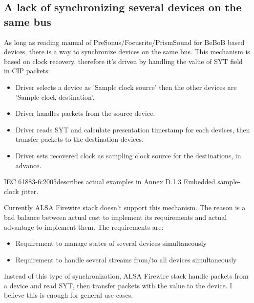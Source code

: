 \documentclass[onecolumn]{article}
\begin{document}
\subsection{A lack of synchronizing several devices on the same bus}
As long as reading manual of PreSonus/Focusrite/PrismSound for BeBoB based devices, there is a way to synchronize devices on the same bus. This mechanism is based on clock recovery, therefore it's driven by handling the value of SYT field in CIP packets:
\begin{itemize}
\item Driver selects a device as 'Sample clock source' then the other devices are 'Sample clock destination'.
\item Driver handles packets from the source device.
\item Driver reads SYT and calculate presentation timestamp for each devices, then transfer packets to the destination devices.
\item Driver sets recovered clock as sampling clock source for the destinations, in advance.
\end{itemize}

IEC 61883-6:2005\cite{iec61883-6-2}describes actual examples in Annex D.1.3 Embedded sample-clock jitter.

Currently ALSA Firewire stack doesn't support this mechanism. The reason is a bad balance between actual cost to implement its requirements and actual advantage to implement them. The requirements are:
\begin{itemize}
\item Requirement to manage states of several devices simultaneously
\item Requirement to handle several streams from/to all devices simultaneously
\end{itemize}

Instead of this type of synchronization, ALSA Firewire stack handle packets from a device and read SYT, then transfer packets with the value to the device. I believe this is enough for general use cases.

\newpage
\end{document}
